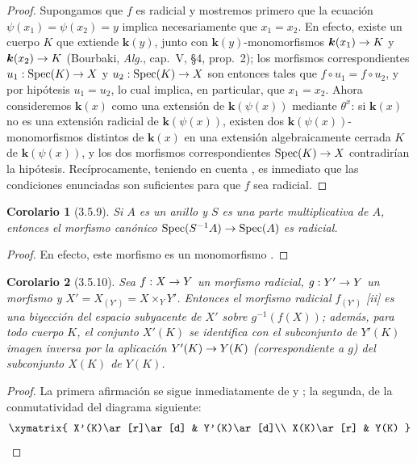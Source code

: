 \documentclass[oneside]{amsart}
\theoremstyle{ega-env-style}
\theoremstyle{ega-thm-env-style}
\newtheorem*{corollary}{Corolario}
\theoremstyle{ega-defn-env-style}
\renewcommand{\to}{\mathchoice{\longrightarrow}{\rightarrow}{\rightarrow}{\rightarrow}}
\newcommand{\oldpage}[2][]{{\marginnote{\normalfont{\textbf{#1}~|~#2}}}\ignorespaces}
\let\EGAOriginalLabel\label
\renewcommand{\label}[1]{\phantomsection\EGAOriginalLabel{#1}}
\begin{document}
\begin{proof}
Supongamos que $f$ es radicial y mostremos primero que la ecuación $\psi(x_1)=\psi(x_2)=y$ implica necesariamente que $x_1=x_2$.
En efecto, existe un cuerpo $K$ que extiende $\boldsymbol{k}(y)$, junto con $\boldsymbol{k}(y)$-monomorfismos $\boldsymbol{k}(x_1)\to K$ y $\boldsymbol{k}(x_2)\to K$ (Bourbaki, \emph{Alg.}, cap.~V, §4, prop.~2); los morfismos correspondientes $u_1:\operatorname{Spec}(K)\to X$ y $u_2:\operatorname{Spec}(K)\to X$ son entonces tales que $f\circ u_1=f\circ u_2$, y por hipótesis $u_1=u_2$, lo cual implica, en particular, que $x_1=x_2$.
Ahora consideremos $\boldsymbol{k}(x)$ como una extensión de $\boldsymbol{k}(\psi(x))$ mediante $\theta^x$: si $\boldsymbol{k}(x)$ no es una extensión radicial de $\boldsymbol{k}(\psi(x))$, existen dos $\boldsymbol{k}(\psi(x))$-monomorfismos distintos de $\boldsymbol{k}(x)$ en una extensión algebraicamente cerrada $K$ de $\boldsymbol{k}(\psi(x))$, y los dos morfismos correspondientes $\operatorname{Spec}(K)\to X$ contradirían la hipótesis.
Recíprocamente, teniendo en cuenta , es inmediato que las condiciones enunciadas son suficientes para que $f$ sea radicial.
\end{proof}

\begin{corollary}[3.5.9]
\label{I.3.5.9}
Si $A$ es un anillo y $S$ es una parte multiplicativa de $A$, entonces el morfismo canónico $\operatorname{Spec}(S^{-1}A)\to\operatorname{Spec}(A)$ es radicial.
\end{corollary}

\begin{proof}
En efecto, este morfismo es un monomorfismo .
\end{proof}

\begin{corollary}[3.5.10]
\label{I.3.5.10}
Sea $f:X\to Y$ un morfismo radicial, $g:Y'\to Y$ un morfismo y $X'=X_{(Y')}=X\times_Y Y'$.
Entonces el morfismo radicial $f_{(Y')}$ [ii] es una biyección del espacio subyacente de $X'$ sobre $g^{-1}(f(X))$; además, para todo cuerpo $K$, el conjunto $X'(K)$ se identifica con el subconjunto de $Y'(K)$ imagen inversa por la aplicación $Y'(K)\to Y(K)$ (correspondiente a $g$) del subconjunto $X(K)$ de $Y(K)$.
\end{corollary}

\begin{proof}
La primera afirmación se sigue inmediatamente de  y ; la segunda, de la conmutatividad del diagrama siguiente:\oldpage[I]{117}
\label{I.3.5.10.base-change-points-diagram-fr}
\[
  \xymatrix{
    X'(K)\ar[r]\ar[d] & Y'(K)\ar[d]\\
    X(K)\ar[r] & Y(K)
  }
\]
\end{proof}
\end{document}
